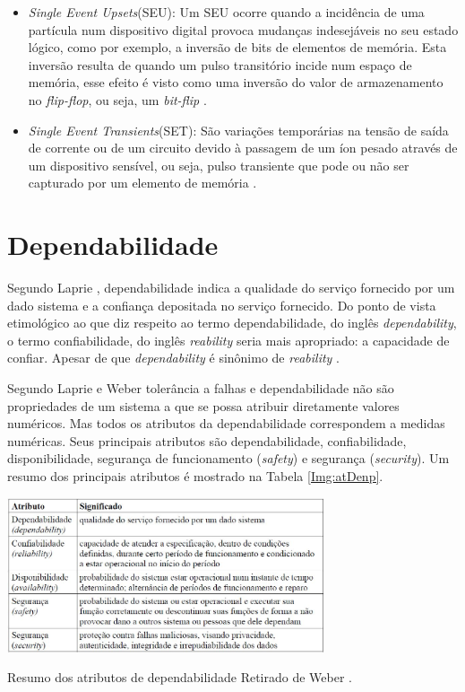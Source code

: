 \begin{itemize}
	\item \textit{Single Event Upsets}(SEU): Um SEU ocorre quando a incidência de uma partícula num dispositivo digital provoca mudanças indesejáveis no seu estado lógico, como por exemplo, a inversão de bits de elementos de memória. Esta inversão resulta de quando um pulso transitório incide num espaço de memória, esse efeito é visto como uma inversão do valor de armazenamento no \textit{flip-flop}, ou seja, um \textit{bit-flip} \cite{Normand:1996}.
	
	\item \textit{Single Event Transients}(SET): São variações temporárias na tensão de saída de corrente ou de um circuito
	devido à passagem de um íon pesado através de um dispositivo sensível, ou seja, pulso transiente que pode ou não ser capturado por um elemento de memória \cite{Ecoffet:1994}.
\end{itemize}

\section{Dependabilidade} \label{sec:denpendabilidade}

Segundo Laprie \cite{LaprieAcidente:1990}, dependabilidade indica a qualidade do serviço fornecido por um dado sistema e a confiança depositada no serviço fornecido. Do ponto de vista etimológico ao que diz respeito ao termo dependabilidade, do inglês \textit{dependability}, o termo confiabilidade, do inglês \textit{reability} seria mais apropriado: a capacidade de confiar. Apesar de que \textit{dependability} é sinônimo de \textit{reability} \cite{LaprieAcidente:1990}. 

Segundo Laprie e Weber \cite{LaprieAcidente:1990, Weber:2002} tolerância a falhas e dependabilidade não são propriedades de um sistema a que se possa atribuir diretamente valores numéricos. Mas todos os atributos da dependabilidade correspondem a medidas numéricas. Seus principais atributos são dependabilidade, confiabilidade, disponibilidade, segurança de funcionamento (\textit{safety}) e segurança (\textit{security}). Um resumo dos principais
atributos é mostrado na Tabela \ref{Img:atDenp}.     


\begin{table}[h]
	\centering
	\includegraphics[width=0.7\textwidth]{figuras/tabelaDenpendabilidade.jpg}
	\caption[Resumo dos Atributos de Denpendabilidade]{Resumo dos atributos de dependabilidade Retirado de Weber \cite{Weber:2002}.}
	\label{Img:atDenp}	
\end{table}



